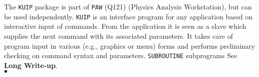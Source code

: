                                     
                    
\Submitter{}                                     
                               
The {\tt KUIP} package is part of {\tt PAW} (Q121)
(Physics Analysis Workstation), but can be used independently.
{\tt KUIP} is an interface program for any application
based on interactive input of commands.
From the application it is seen as a slave which supplies the
next command with its associated parameters.
It takes care of program input in various (e.g., graphics or menu) forms
and performs preliminary checking on command syntax and parameters.
\Structure
{\tt SUBROUTINE} subprograms
\Usage
See {\bf Long Write-up}.
\\ $\bullet$
